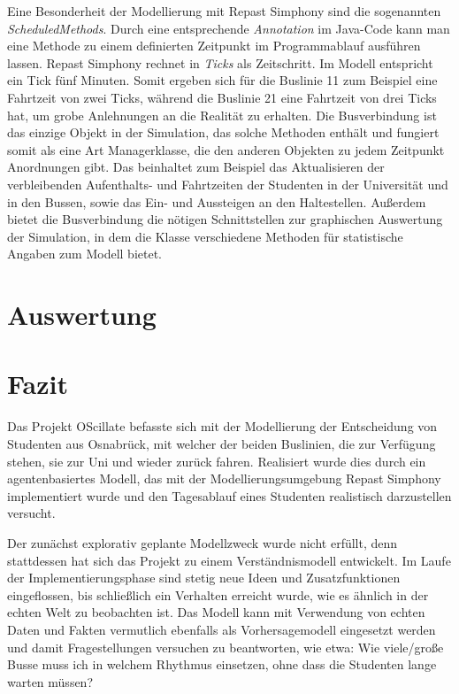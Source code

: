 \documentclass[12pt,a4paper]{scrartcl}
\begin{document}
Eine Besonderheit der Modellierung mit Repast Simphony sind die sogenannten \textit{ScheduledMethods}. Durch eine entsprechende \textit{Annotation} im Java-Code kann man eine Methode zu einem definierten Zeitpunkt im Programmablauf ausführen lassen. Repast Simphony rechnet in \textit{Ticks} als Zeitschritt. Im Modell entspricht ein Tick fünf Minuten. Somit ergeben sich für die Buslinie 11 zum Beispiel eine Fahrtzeit von zwei Ticks, während die Buslinie 21 eine Fahrtzeit von drei Ticks hat, um grobe Anlehnungen an die Realität zu erhalten. Die Busverbindung ist das einzige Objekt in der Simulation, das solche Methoden enthält und fungiert somit als eine Art Managerklasse, die den anderen Objekten zu jedem Zeitpunkt Anordnungen gibt. Das beinhaltet zum Beispiel das Aktualisieren der verbleibenden Aufenthalts- und Fahrtzeiten der Studenten in der Universität und in den Bussen, sowie das Ein- und Aussteigen an den Haltestellen. Außerdem bietet die Busverbindung die nötigen Schnittstellen zur graphischen Auswertung der Simulation, in dem die Klasse verschiedene Methoden für statistische Angaben zum Modell bietet. 

\section{Auswertung}\label{erg}

\section{Fazit}\label{fazit}
Das Projekt OScillate befasste sich mit der Modellierung der Entscheidung von Studenten aus Osnabrück, mit welcher der beiden Buslinien, die zur Verfügung stehen, sie zur Uni und wieder zurück fahren. Realisiert wurde dies durch ein agentenbasiertes Modell, das mit der Modellierungsumgebung Repast Simphony implementiert wurde und den Tagesablauf eines Studenten realistisch darzustellen versucht. 

Der zunächst explorativ geplante Modellzweck wurde nicht erfüllt, denn stattdessen hat sich das Projekt zu einem Verständnismodell entwickelt. Im Laufe der Implementierungsphase sind stetig neue Ideen und Zusatzfunktionen eingeflossen, bis schließlich ein Verhalten erreicht wurde, wie es ähnlich in der echten Welt zu beobachten ist. Das Modell kann mit Verwendung von echten Daten und Fakten vermutlich ebenfalls als Vorhersagemodell eingesetzt werden und damit Fragestellungen versuchen zu beantworten, wie etwa: \glqq Wie viele/große Busse muss ich in welchem Rhythmus einsetzen, ohne dass die Studenten lange warten müssen?\grqq~ 
\end{document}
